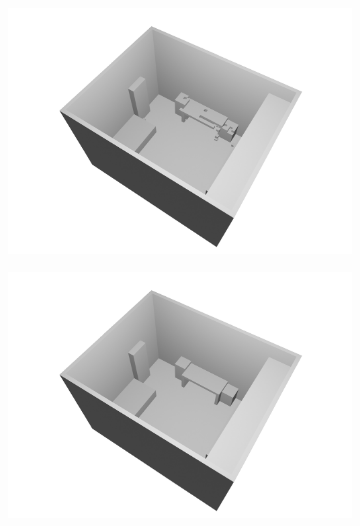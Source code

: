 \documentclass[binding=0.6cm,noexaminfo]{sapthesis}
\begin{document}
\begin{figure}[h!]
\begin{subfigure}{.49\textwidth}
	\centering
	\includegraphics[width=.90\linewidth]{results/pred_1}
	\caption{}
\end{subfigure}
\begin{subfigure}{.49\textwidth}
	\centering
	\includegraphics[width=.90\linewidth]{results/true_1}
	\caption{}
\end{subfigure}


\end{figure}
\end{document}
